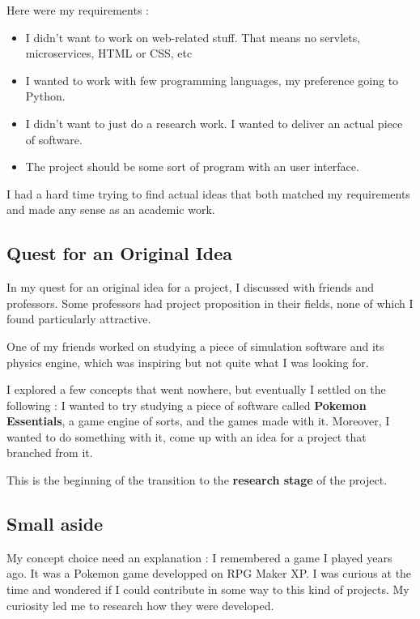 \documentclass[11pt]{article}
\begin{document}
Here were my requirements :
\begin{itemize}
	\item I didn't want to work on web-related stuff. That means no servlets, microservices, HTML or CSS, etc
	
	\item I wanted to work with few programming languages, my preference going to Python.
	
	\item I didn't want to just do a research work. I wanted to deliver an actual piece of software.
	
	\item The project should be some sort of program with an user interface.
\end{itemize}

I had a hard time trying to find actual ideas that both matched my requirements and made any sense as an academic work.


\subsection{Quest for an Original Idea}

In my quest for an original idea for a project, I discussed with friends and professors. Some professors had project proposition in their fields, none of which I found particularly attractive.

One of my friends worked on studying a piece of simulation software and its physics engine, which was inspiring but not quite what I was looking for.

I explored a few concepts that went nowhere, but eventually I settled on the following : I wanted to try studying a piece of software called \textbf{Pokemon Essentials}, a game engine of sorts, and the games made with it. Moreover, I wanted to do something with it, come up with an idea for a project that branched from it.

This is the beginning of the transition to the \textbf{research stage} of the project.

\newpage
\subsection{Small aside}

My concept choice need an explanation : I remembered a game I played years ago. It was a Pokemon game developped on RPG Maker XP. I was curious at the time and wondered if I could contribute in some way to this kind of projects. My curiosity led me to research how they were developed.
\end{document}
